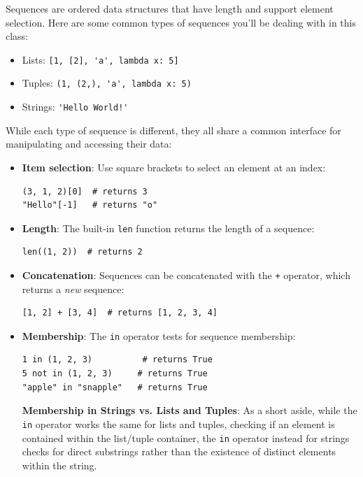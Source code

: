 \small %

Sequences are ordered data structures that have length and support element selection. Here are some common types of sequences you'll be dealing with in this class: 
\begin{itemize}
	\item Lists: \lstinline{[1, [2], 'a', lambda x: 5]}
	\item Tuples: \lstinline{(1, (2,), 'a', lambda x: 5)}
	\item Strings: \lstinline{'Hello World!'}
\end{itemize}

While each type of sequence is different, they all share a common interface for manipulating and accessing their data: 
\begin{itemize}
	\item \textbf{Item selection}: Use square brackets to select an element at an index: 
	\begin{lstlisting}
(3, 1, 2)[0]  # returns 3
"Hello"[-1]   # returns "o"
	\end{lstlisting}

	\item \textbf{Length}: The built-in \lstinline{len} function returns the length of a sequence: 
	\begin{lstlisting}
len((1, 2))  # returns 2
	\end{lstlisting}

	\item \textbf{Concatenation}: Sequences can be concatenated with the \lstinline{+} operator, which returns a \textit{new} sequence:
	\begin{lstlisting}
[1, 2] + [3, 4]  # returns [1, 2, 3, 4]
	\end{lstlisting}

	\item \textbf{Membership}: The \lstinline{in} operator tests for sequence membership: 
	\begin{lstlisting}
1 in (1, 2, 3)          # returns True
5 not in (1, 2, 3)     # returns True
"apple" in "snapple"   # returns True
	\end{lstlisting}

    \textbf{Membership in Strings vs. Lists and Tuples}: As a short aside, while the \lstinline{in} operator works the same for lists and tuples, checking if an element is contained within the list/tuple container, the \lstinline{in} operator instead for strings checks for direct substrings rather than the existence of distinct elements within the string.


\end{itemize}
